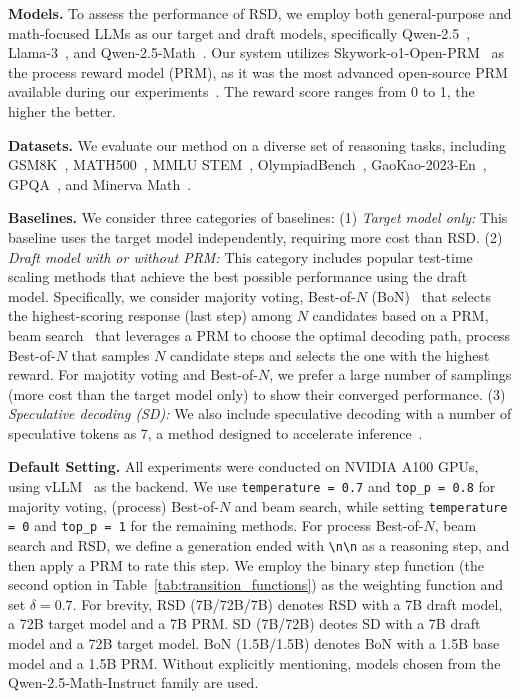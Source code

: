 \documentclass{article}
\theoremstyle{plain}
\theoremstyle{definition}
\theoremstyle{remark}
\begin{document}
\textbf{Models.} To assess the performance of RSD, we employ both general-purpose and math-focused LLMs as our target and draft models, specifically Qwen-2.5~\citep{yang2024qwen2}, Llama-3~\citep{dubey2024llama}, and Qwen-2.5-Math~\citep{yang2024qwen2math}. Our system utilizes Skywork-o1-Open-PRM~\citep{skyworkopeno12024} as the process reward model (PRM), as it was the most advanced open-source PRM available during our experiments~\citep{processbench}. The reward score ranges from 0 to 1, the higher the better.

\textbf{Datasets.} We evaluate our method on a diverse set of reasoning tasks, including GSM8K~\citep{cobbe2021training}, MATH500~\citep{hendrycks2021measuring}, MMLU STEM~\citep{hendrycks2020measuring}, OlympiadBench~\citep{he2024olympiadbench}, GaoKao-2023-En~\citep{liao2024mario}, GPQA~\citep{rein2023gpqa}, and Minerva Math~\citep{minerva}.

\textbf{Baselines.} We consider three categories of baselines: (1) \emph{Target model only:} This baseline uses the target model independently, requiring more cost than RSD.  (2) \emph{Draft model with or without PRM:} This category includes popular test-time scaling methods that achieve the best possible performance using the draft model. Specifically, we consider majority voting, Best-of-$N$ (BoN)~\citep{brown2024large,cobbe2021best} that selects the highest-scoring response (last step) among $N$ candidates based on a PRM, beam search~\citep{chen2024alphamath} that leverages a PRM to choose the optimal decoding path, process Best-of-$N$ that samples $N$ candidate steps and selects the one with the highest reward. For majotity voting and Best-of-$N$, we prefer a large number of samplings (more cost than the target model only) to show their converged performance. (3) \emph{Speculative decoding (SD):} We also include speculative decoding with a number of speculative tokens as 7, a method designed to accelerate inference~\citep{leviathan2023fast}.

\textbf{Default Setting.} All experiments were conducted on NVIDIA A100 GPUs, using vLLM~\citep{kwon2023efficient} as the backend. We use \texttt{temperature = 0.7} and \texttt{top\_p = 0.8} for majority voting, (process) Best-of-$N$ and beam search, while setting \texttt{temperature = 0} and \texttt{top\_p = 1} for the remaining methods. For process Best-of-$N$, beam search and RSD, we define a generation ended with \texttt{\textbackslash n\textbackslash n} as a reasoning step, and then apply a PRM to rate this step. We employ the binary step function (the second option in Table~\ref{tab:transition_functions}) as the weighting function and set $\delta=0.7$.  For brevity, RSD (7B/72B/7B) denotes RSD with a 7B draft model, a 72B target model and a 7B PRM. SD (7B/72B) deotes SD with a 7B draft model and a 72B target model. BoN (1.5B/1.5B) denotes BoN with a 1.5B base model and a 1.5B PRM. Without explicitly mentioning, models chosen from the Qwen-2.5-Math-Instruct family are used.
\end{document}
